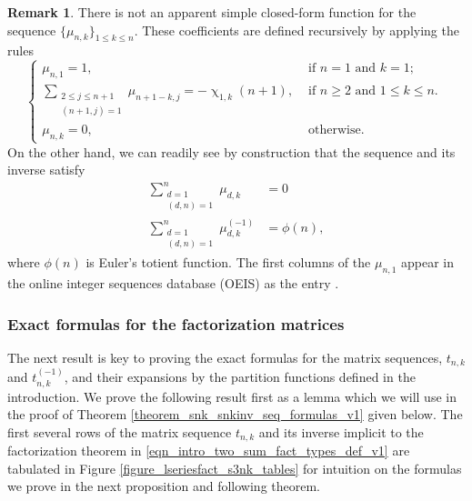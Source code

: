\documentclass[12pt,reqno,a4letter]{article}
\numberwithin{figure}{section}
\numberwithin{table}{section}
\numberwithin{equation}{section}
\newcommand{\seqnum}[1]{\href{http://oeis.org/#1}{\color{ProcessBlue}{\underline{#1}}}}
\renewcommand{\chi}{\upchi}
\theoremstyle{plain}
\numberwithin{theorem}{section}
\theoremstyle{definition}
\newtheorem{remark}[theorem]{Remark}
\begin{document}
\begin{remark} 
There is not an apparent 
simple closed-form function for the sequence $\{\mu_{n,k}\}_{1 \leq k \leq n}$. 
These coefficients are defined recursively by  applying the rules 
\[
\begin{cases}
\mu_{n,1} = 1, & \text{ if $n = 1$ and $k = 1$; } \\ 
\sum\limits_{\substack{2 \leq j \leq n+1 \\ (n+1,j)=1}} \mu_{n+1-k,j} = -\chi_{1,k}(n+1), & 
     \text{ if $n \geq 2$ and $1 \leq k \leq n$. } \\ 
\mu_{n,k} = 0, & \text{ otherwise. }
\end{cases}
\]
On the other hand, we can readily see by construction that the 
sequence and its inverse satisfy 
\begin{align*} 
\sum_{\substack{d=1 \\ (d,n)=1}}^n \mu_{d,k} & = 0 \\ 
\sum_{\substack{d=1 \\ (d,n)=1}}^n \mu_{d,k}^{(-1)} & = \phi(n), 
\end{align*} 
where $\phi(n)$ is Euler's totient function. 
The first columns of the $\mu_{n,1}$ appear in the online integer sequences 
database (OEIS) as the entry \cite[\seqnum{A096433}]{OEIS}. 
\end{remark} 

\subsubsection{Exact formulas for the factorization matrices} 

The next result is key to proving the exact formulas for the matrix sequences, 
$t_{n,k}$ and $t_{n,k}^{(-1)}$, and their expansions by the partition functions defined 
in the introduction. We prove the following result
first as a lemma which we will use in the proof of 
Theorem \ref{theorem_snk_snkinv_seq_formulas_v1} given below. 
The first several rows of the matrix sequence $t_{n,k}$ and its inverse 
implicit to the factorization theorem in \eqref{eqn_intro_two_sum_fact_types_def_v1} are tabulated in 
Figure \ref{figure_lseriesfact_s3nk_tables} for intuition on the 
formulas we prove in the next proposition and following theorem. 
\end{document}
